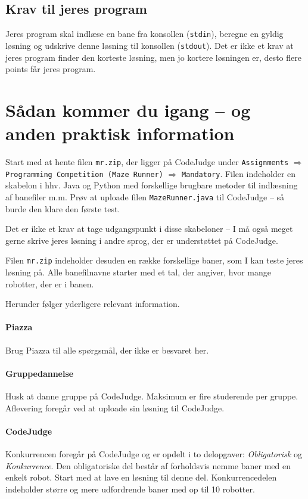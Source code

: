 \documentclass[10pt, a4paper]{article}
\begin{document}
\subsection{Krav til jeres program}
Jeres program skal indlæse en bane fra konsollen (\texttt{stdin}), beregne en gyldig løsning og udskrive denne løsning til konsollen (\texttt{stdout}).
Det er ikke et krav at jeres program finder den korteste løsning, men jo kortere løsningen er, desto flere points får jeres program.

\section{Sådan kommer du igang -- og anden praktisk information}
Start med at hente filen \texttt{mr.zip}, der ligger på CodeJudge under \texttt{Assignments} $\Rightarrow$ \texttt{Programming Competition (Maze Runner)} $\Rightarrow$ \texttt{Mandatory}.
Filen indeholder en skabelon i hhv. Java og Python med forskellige brugbare metoder til indlæsning af banefiler m.m.
Prøv at uploade filen \texttt{MazeRunner.java} til CodeJudge -- så burde den klare den første test.

Det er ikke et krav at tage udgangspunkt i disse skabeloner -- I må også meget gerne skrive jeres løsning i andre sprog, der er understøttet på CodeJudge.

Filen \texttt{mr.zip} indeholder desuden en række forskellige baner, som I kan teste jeres løsning på.
Alle banefilnavne starter med et tal, der angiver, hvor mange robotter, der er i banen.

Herunder følger yderligere relevant information.

\paragraph{Piazza} Brug Piazza til alle spørgsmål, der ikke er besvaret her.

\paragraph{Gruppedannelse} Husk at danne gruppe på CodeJudge.
Maksimum er fire studerende per gruppe.
Aflevering foregår ved at uploade sin løsning til CodeJudge.

\paragraph{CodeJudge} Konkurrencen foregår på CodeJudge og er opdelt i to delopgaver: \emph{Obligatorisk} og \emph{Konkurrence}.
Den obligatoriske del består af forholdsvis nemme baner med en enkelt robot.
Start med at lave en løsning til denne del.
Konkurrencedelen indeholder større og mere udfordrende baner med op til 10 robotter.
\end{document}
